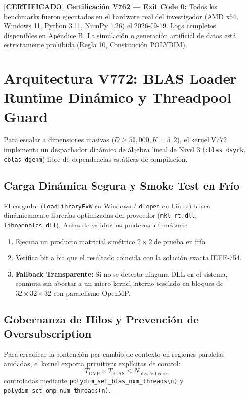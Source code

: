 \textbf{[CERTIFICADO]} 
\textbf{Certificación V762 --- Exit Code 0:}
Todos los benchmarks fueron ejecutados en el hardware real del investigador
(AMD x64, Windows 11, Python 3.11, NumPy 1.26) el 2026-09-19.
Logs completos disponibles en Apéndice B.
La simulación o generación artificial de datos está estrictamente prohibida
(Regla 10, Constitución POLYDIM).


\section{Arquitectura V772: BLAS Loader Runtime Dinámico y Threadpool Guard}


Para escalar a dimensiones masivas ($D \ge 50{,}000, K = 512$), el kernel V772 implementa un despachador dinámico de álgebra lineal de Nivel 3 (\texttt{cblas\_dsyrk}, \texttt{cblas\_dgemm}) libre de dependencias estáticas de compilación.

\subsection{Carga Dinámica Segura y Smoke Test en Frío}
El cargador (\texttt{LoadLibraryExW} en Windows / \texttt{dlopen} en Linux) busca dinámicamente librerías optimizadas del proveedor (\texttt{mkl\_rt.dll}, \texttt{libopenblas.dll}). Antes de validar los punteros a funciones:
\begin{enumerate}
    \item Ejecuta un producto matricial simétrico $2 \times 2$ de prueba en frío.
    \item Verifica bit a bit que el resultado coincida con la solución exacta IEEE-754.
    \item \textbf{Fallback Transparente:} Si no se detecta ninguna DLL en el sistema, conmuta sin abortar a un micro-kernel interno teselado en bloques de $32 \times 32 \times 32$ con paralelismo OpenMP.
\end{enumerate}

\subsection{Gobernanza de Hilos y Prevención de Oversubscription}
Para erradicar la contención por cambio de contexto en regiones paralelas anidadas, el kernel exporta primitivas explícitas de control:
\begin{equation}
T_{\text{OMP}} \times T_{\text{BLAS}} \le N_{\text{physical\_cores}}
\end{equation}
controladas mediante \texttt{polydim\_set\_blas\_num\_threads(n)} y \texttt{polydim\_set\_omp\_num\_threads(n)}.

